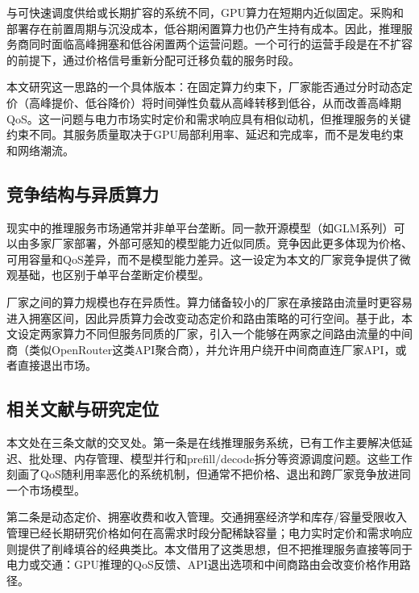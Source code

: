 \documentclass[UTF8,11pt]{ctexart}
\begin{document}
与可快速调度供给或长期扩容的系统不同，GPU算力在短期内近似固定。采购和部署存在前置周期与沉没成本，低谷期闲置算力也仍产生持有成本。因此，推理服务商同时面临高峰拥塞和低谷闲置两个运营问题。一个可行的运营手段是在不扩容的前提下，通过价格信号重新分配可迁移负载的服务时段。

本文研究这一思路的一个具体版本：在固定算力约束下，厂家能否通过分时动态定价（高峰提价、低谷降价）将时间弹性负载从高峰转移到低谷，从而改善高峰期QoS。这一问题与电力市场实时定价和需求响应具有相似动机\cite{schweppe1988spot,borenstein2005long,albadi2008summary,faruqui2010household,siano2014demand}，但推理服务的关键约束不同。其服务质量取决于GPU局部利用率、延迟和完成率，而不是发电约束和网络潮流。

\subsection{竞争结构与异质算力}

现实中的推理服务市场通常并非单平台垄断。同一款开源模型（如GLM系列）可以由多家厂家部署，外部可感知的模型能力近似同质。竞争因此更多体现为价格、可用容量和QoS差异，而不是模型能力差异。这一设定为本文的厂家竞争提供了微观基础，也区别于单平台垄断定价模型。

厂家之间的算力规模也存在异质性。算力储备较小的厂家在承接路由流量时更容易进入拥塞区间，因此异质算力会改变动态定价和路由策略的可行空间。基于此，本文设定两家算力不同但服务同质的厂家，引入一个能够在两家之间路由流量的中间商（类似OpenRouter这类API聚合商），并允许用户绕开中间商直连厂家API，或者直接退出市场。

\subsection{相关文献与研究定位}

本文处在三条文献的交叉处。第一条是在线推理服务系统，已有工作主要解决低延迟、批处理、内存管理、模型并行和prefill/decode拆分等资源调度问题\cite{crankshaw2017clipper,gujarati2020clockwork,romero2021infaas,yu2022orca,li2023alpaserve,sheng2023flexgen,kwon2023pagedattention,agrawal2024sarathiserve,patel2024splitwise,zhong2024distserve,agrawal2024vidur}。这些工作刻画了QoS随利用率恶化的系统机制，但通常不把价格、退出和跨厂家竞争放进同一个市场模型。

第二条是动态定价、拥塞收费和收入管理。交通拥塞经济学和库存/容量受限收入管理已经长期研究价格如何在高需求时段分配稀缺容量\cite{vickrey1969congestion,arnott1990bottleneck,gallego1994dynamic,elmaghraby2003dynamic,bitran2003overview,talluri2004revenue,phillips2005pricing}；电力实时定价和需求响应则提供了削峰填谷的经典类比\cite{schweppe1988spot,borenstein2005long,allcott2011rethinking,siano2014demand}。本文借用了这类思想，但不把推理服务直接等同于电力或交通：GPU推理的QoS反馈、API退出选项和中间商路由会改变价格作用路径。
\end{document}

